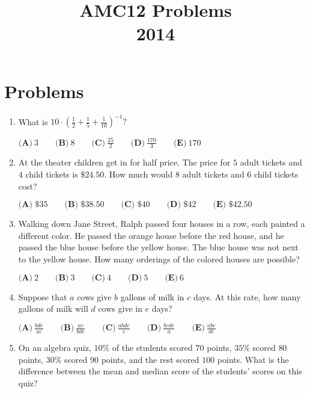 \documentclass{article}
\title{AMC12 Problems \\ 2014}
\date{}
\begin{document}
\maketitle\thispagestyle{fancy}\newpage\section*{Problems}\begin{enumerate}[label=\arabic*., itemsep=0.5em]\item What is $10 \cdot \left(\tfrac{1}{2} + \tfrac{1}{5} + \tfrac{1}{10}\right)^{-1}?$

$ \textbf{(A)}\ 3\qquad\textbf{(B)}\ 8\qquad\textbf{(C)}\ \frac{25}{2}\qquad\textbf{(D)}\ \frac{170}{3}\qquad\textbf{(E)}\ 170$\par \vspace{0.5em}\item At the theater children get in for half price.  The price for $5$ adult tickets and $4$ child tickets is $\$24.50$.  How much would $8$ adult tickets and $6$ child tickets cost?

$\textbf{(A) }\$35\qquad
\textbf{(B) }\$38.50\qquad
\textbf{(C) }\$40\qquad
\textbf{(D) }\$42\qquad
\textbf{(E) }\$42.50$\par \vspace{0.5em}\item Walking down Jane Street, Ralph passed four houses in a row, each painted a different color. He passed the orange house before the red house, and he passed the blue house before the yellow house. The blue house was not next to the yellow house. How many orderings of the colored houses are possible?

$ \textbf{(A)}\ 2\qquad\textbf{(B)}\ 3\qquad\textbf{(C)}\ 4\qquad\textbf{(D)}\ 5\qquad\textbf{(E)}\ 6$\par \vspace{0.5em}\item Suppose that $a$ cows give $b$ gallons of milk in $c$ days. At this rate, how many gallons of milk will $d$ cows give in $e$ days?

$ \textbf{(A)}\ \frac{bde}{ac}\qquad\textbf{(B)}\ \frac{ac}{bde}\qquad\textbf{(C)}\ \frac{abde}{c}\qquad\textbf{(D)}\ \frac{bcde}{a}\qquad\textbf{(E)}\ \frac{abc}{de}$\par \vspace{0.5em}\item On an algebra quiz, $10\%$ of the students scored $70$ points, $35\%$ scored $80$ points, $30\%$ scored $90$ points, and the rest scored $100$ points. What is the difference between the mean and median score of the students' scores on this quiz?


\end{enumerate}
\end{document}
